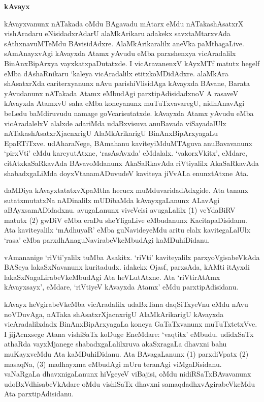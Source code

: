 \bigskip
\begin{center}
{\Large\bf kAvayx}
\end{center}

kAvayxvanunx nATakada oMdu BAgavadu mAtarx eMdu nATakashAsatxrX vishAradaru eNisidadxrAdarU alaMkArikaru adakekx savxtaMtarxvAda sAthxnavuMTeMdu BAvisidAdxre. AlaMkArikaralilx aneVka paMthagaLive. sAmAnayxvAgi kAvayxda Atamx yAvudu eMba parxshenxya vicAradalilx BinAnxBipArxya vayxkatxpaDutatxde. I vicAravanenxV kAyxMTf matutx hegelf eMba dAshaRnikaru `kaleya vicAradalilx etitxkoMDidAdxre. alaMkAra shAsatxrXda cariterxyanunx nAvu parishiVlisidAga kAvayxda BAvane, Barata yAvudanunx nATakada Atamx eMbudAgi parxtipAdisidadxnoV A rasaveV kAvayxda AtamxvU saha eMba koneyanunx muTuTxvavaregU, nidhAnavAgi beLedu baMdiruvudu namage goVcarisutatxde. kAvayxda Atamx yAvudu eMba vicAradalelxV alalxde adariMda udaBxvisuva anuBavada viSayadalUlx nATakashAsatxrXjacnxrigU AlaMkArikarigU BinAnxBipArxyagaLu EpaRTiTxve. udAharaNege, BAmahanu kaviteyiMduMTAguva anuBavavanunx `pirxVti' eMdu kareyutAtxne, `rasAsAvxda' eMdalalx. `vakorxVkitx', eMdare, citAtxkaSaRkavAda BAvavoMdanunx AkaSaRkavAda riVtiyalilx AkaSaRkavAda shabadxgaLiMda doyxVtanamADuvudeV kaviteya jiVvALa enunxtAtxne Ata.

daMDiya kAvayxtatatxvXpaMtha hecucx muMduvaridadAdxgide. Ata tananx sutatxmutatxNa nADinalilx mUDibaMda kAvayxgaLanunx ALavAgi aBAyxsamADidadxnu. avugaLanunx viveVcisi avugaLalilx (1) veYdaBiRV matutx (2) gwDiV eMba eraDu sheYligaLive eMbudanunx KacitapaDisidanu. Ata kaviteyalilx `mAdhuyaR' eMba guNavideyeMdu aritu elalx kavitegaLalUlx `rasa' eMba parxdhAnaguNavirabeVkeMbudAgi kaMDuhiDidanu.

vAmananige `riVti'yalilx tuMba Asakitx. `riVti' kaviteyalilx parxyoVgisabeVkAda BASeya lakaSxNavanunx kuritadudx. idakekx Ojasf, parxsAda, kAMti itAyxdi lakaSxNagaLirabeVkeMbudAgi Ata heVLutAtxne. Ata `riVtirAtAmx kAvayxsayx', eMdare, `riVtiyeV kAvayxda Atamx' eMdu parxtipAdisidanu.

kAvayx heVgirabeVkeMba vicAradalilx udaBxTana daqSiTxyeVnu eMdu nAvu noVDu\-vAga, nATaka shAsatxrXjacnxrigU AlaMkArikarigU kAvayxda vicAradalilxdadx BinAnxBipArxyagaLa koneya GaTaTxvanunx muTuTxtetxVve. I jijAcnxsege Atana vishiSaTx koDuge EneMdare: `vaqtitx' eMbudu. udidxSaTx athaRda vayxMjanege shabadxgaLalilxruva akaSxragaLa dhavxni bahu muKayxveMdu Ata kaMDuhiDidanu. Ata BAvagaLanunx (1) parxdiVpatx (2) masaqNa, (3) madhayxma eMbudAgi mUru teranAgi viMgaDisidanu. vaNaRgaLa dhavxnigaLanunx hiVgeyeV viBajisi, oMdu nidiRSaTxBAvavanunx udoBxVdhisabeVkAdare oMdu vishiSaTx dhavxni samaqdadhxvAgirabeVkeMdu Ata parxtipAdisidanu.

